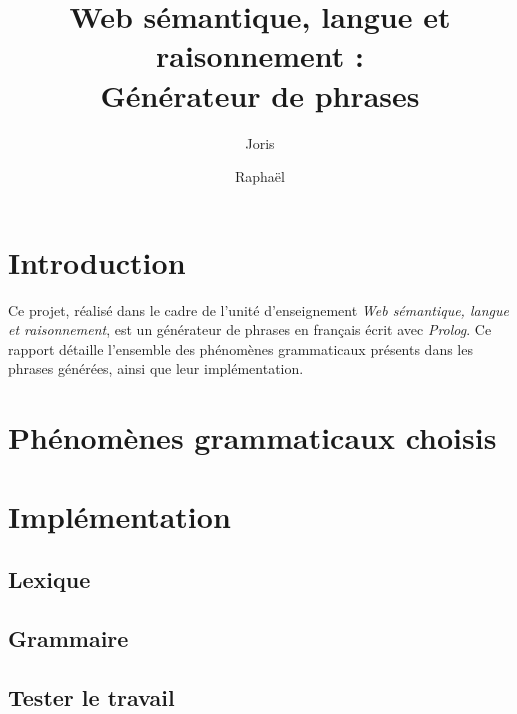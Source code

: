 \documentclass[a4paper,10pt]{article}
\title{
	\textbf{Web sémantique, langue et raisonnement :\\
          Générateur de phrases} }
\author{
	Joris \Nom{Pablo} \and Raphaël \Nom{Gaudy} }
\newcommand\Terme\textit
\begin{document}
\maketitle

\section{Introduction}
Ce projet, réalisé dans le cadre de l'unité d'enseignement \Terme{Web sémantique, langue et raisonnement}, est un générateur de phrases en français écrit avec \Terme{Prolog}. Ce rapport détaille l'ensemble des phénomènes grammaticaux présents dans les phrases générées, ainsi que leur implémentation.

\section{Phénomènes grammaticaux choisis}


\section{Implémentation}
\subsection{Lexique}

\subsection{Grammaire}

\subsection{Tester le travail}
\end{document}
